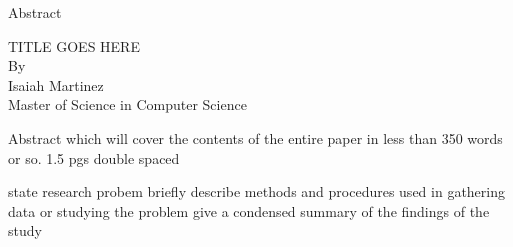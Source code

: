 \begin{customsection}[true]{Abstract}
    \begin{center}
        TITLE GOES HERE\\
        \vspace{0.15in}
        By\\
        \vspace{0.15in}
        Isaiah Martinez\\
        \vspace{0.3in}
        Master of Science in Computer Science\\
        \vspace{0.15in}
    \end{center}

    \begin{center}
        Abstract which will cover the contents of the entire paper in less than 350 words or so.
        1.5 pgs double spaced

        state research probem briefly
        describe methods and procedures used in gathering data or studying the problem
        give a condensed summary of the findings of the study
    \end{center}
\end{customsection}